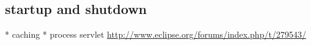 \documentclass[a4paper,10pt,twoside]{book}
\begin{document}
\subsection{startup and shutdown}
  * caching
  * process servlet
  \url{http://www.eclipse.org/forums/index.php/t/279543/}
  
\begin{table}
\begin{center}
\caption{Numbers of distinct differentiable structures on real $n$-space
and $n$-spheres}
\label{diffstruc}
\end{center}
\end{table}


\ifx\wholebook\relax\else
   
   
\end{document}
